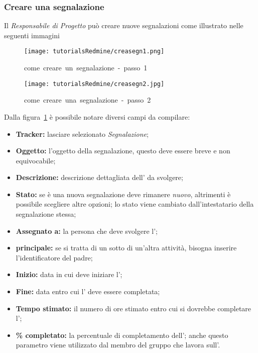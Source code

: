 \documentclass{scalatekids-article}
\begin{document}
\subsubsection{Creare una segnalazione}

Il \textit{Responsabile di Progetto} può creare nuove segnalazioni come illustrato nelle seguenti immagini
\begin{figure}[H]
  \centering
  \texttt{[image: tutorialsRedmine/creasegn1.png]}
  \caption{come\ creare\ un\ segnalazione\ -\ passo\ 1}
\end{figure}
\begin{figure}[H]
  \centering
  \texttt{[image: tutorialsRedmine/creasegn2.jpg]}
  \caption{come\ creare\ una\ segnalazione\ -\ passo\ 2\label{fig:crea-segnalazione-2}}
\end{figure}
Dalla figura~\ref{fig:crea-segnalazione-2} è possibile notare diversi campi da compilare:
\begin{itemize}
\item \textbf{Tracker:} lasciare selezionato \textit{Segnalazione};
\item \textbf{Oggetto:} l'oggetto della segnalazione, questo deve essere breve e non equivocabile;
\item \textbf{Descrizione:} descrizione dettagliata dell' da svolgere;
\item \textbf{Stato:} se è una nuova segnalazione deve rimanere \textit{nuovo}, altrimenti è possibile scegliere altre opzioni; lo stato viene cambiato dall'intestatario della segnalazione stessa;
\item \textbf{Assegnato a:} la persona che deve svolgere l';
\item \textbf{ principale:} se si tratta di un sotto  di un'altra attività, bisogna inserire l'identificatore del  padre;
\item \textbf{Inizio:} data in cui deve iniziare l';
\item \textbf{Fine:} data entro cui l' deve essere completata;
\item \textbf{Tempo stimato:} il numero di ore stimato entro cui si dovrebbe completare l';
\item \textbf{\% completato:} la percentuale di completamento dell'; anche questo parametro viene utilizzato dal membro del gruppo che lavora sull'.
\end{itemize}
\end{document}
